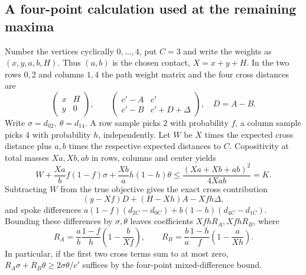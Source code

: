 \documentclass[11pt,a4paper]{article}
\theoremstyle{definition}
\begin{document}
\subsection{A four-point calculation used at the remaining maxima}

Number the vertices cyclically $0,\ldots,4$, put $C=3$ and write the
weights as $(x,y,a,b,H)$. Thus $(a,b)$ is the chosen contact,
$X=x+y+H$. In the two rows $0,2$ and columns $1,4$ the path weight
matrix and the four cross distances are
\begin{equation}\label{eq:pent-matrix}
 \begin{pmatrix}x&H\\y&0\end{pmatrix},\qquad
 \begin{pmatrix}c'-A&c'\\c'-B&c'+D+\Delta\end{pmatrix},\quad D=A-B.
\end{equation}
Write $\sigma=d_{02},\ \theta=d_{14}$. A row sample picks $2$ with
probability $f$, a column sample picks $4$ with probability $h$,
independently. Let $W$ be $X$ times the expected cross distance plus
$a,b$ times the respective expected distances to $C$. Copositivity
at total masses $Xa,Xb,ab$ in rows, columns and center yields
\begin{equation}\label{eq:pent-fund}
 W+\frac{Xa}{b}f(1-f)\sigma+\frac{Xb}{a}h(1-h)\theta
 \le \frac{(Xa+Xb+ab)^2}{4Xab}=K .
\end{equation}
Subtracting $W$ from the true objective gives the exact cross contribution
\[
 (y-Xf)D+(H-Xh)A-Xfh\Delta,
\]
and spoke differences $a(1-f)(d_{2C}-d_{0C})+
b(1-h)(d_{4C}-d_{1C})$. Bounding these differences by $\sigma,\theta$
leaves coefficients $XfhR_A,XfhR_B$, where
\begin{equation}\label{eq:pent-R}
 R_A=\frac ab\frac{1-f}{h}\left(1-\frac b{Xf}\right),\qquad
 R_B=\frac ba\frac{1-h}{f}\left(1-\frac a{Xh}\right).
\end{equation}
In particular, if the first two cross terms sum to at most zero,
$R_A\sigma+R_B\theta\ge2\sigma\theta/c'$ suffices by the four-point
mixed-difference bound.
\end{document}
